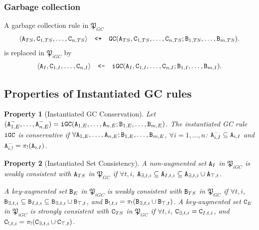 \documentclass{article}
\numberwithin{equation}{section}
\newtheorem{property}{Property}[section]
\renewcommand{\tt}[1]{\ifmmode\text{\texttt{#1}}\else\texttt{#1}\fi}
\begin{document}
\subsubsection{Garbage collection}
A garbage collection rule in $\mathfrak{P}_{GC}$
\begin{align*}
\langle \tt{A}_{TS}, \tt{C}_{1,TS}, \dots, \tt{C}_{n,TS} \rangle
\quad\tt{<+}\quad
\tt{GC}(\tt{A}_{TS}, \tt{C}_{1,TS}, \dots, \tt{C}_{n,TS}; \tt{B}_{1,TS}, \dots, \tt{B}_{m,TS}).
\end{align*}
is replaced in $\mathfrak{P}_{iGC}$ by
\begin{align*}
\langle \tt{A}_I, \tt{C}_{1,I}, \dots, \tt{C}_{n,I} \rangle
\quad\tt{<-}\quad
\tt{iGC}(\tt{A}_I, \tt{C}_{1,I}, \dots, \tt{C}_{n,I}; \tt{B}_{1,I}, \dots, \tt{B}_{m,I}).
\end{align*}



\subsection{Properties of Instantiated GC rules}
\begin{property}[Instantiated GC Conservation]\label{property:instantiated_gc_conservative}
Let $(\tt{A}_{1,E}^-, \dots, \tt{A}_{n,E}^-) = \tt{iGC}(\tt{A}_{1,E}, \dots, \tt{A}_{n,E}; \tt{B}_{1,E}, \dots, \tt{B}_{m,E})$.
The instantiated GC rule $\tt{iGC}$ is \emph{conservative} if $\forall \tt{A}_{1,E}, \dots, \tt{A}_{n,E}; \tt{B}_{1,E}, \dots, \tt{B}_{m,E}$, $\forall i=1,\dots,n$: $\tt{A}_{i,I}^- \subseteq \tt{A}_{i,I}$ and $\tt{A}_{i,!}^- = \pi_!(\tt{A}_{i,I})$.
\end{property}

\begin{property}[Instantiated Set Consistency]
A non-augmented set $\tt{A}_I$ in $\mathfrak{P}_{iGC}$ is \emph{weakly consistent} with $\tt{A}_{TS}$ in $\mathfrak{P}_{GC}$ if $\forall t, i$, $\tt{A}_{\exists,t,i} \subseteq \tt{A}_{I,t,i} \subseteq \tt{A}_{\exists,t,i} \cup \tt{A}_{\top,t}$.

A key-augmented set $\tt{B}_E$ in $\mathfrak{P}_{iGC}$ is \emph{weakly consistent} with $\tt{B}_{TS}$ in $\mathfrak{P}_{GC}$ if $\forall t, i$, $\tt{B}_{\exists,t,i} \subseteq \tt{B}_{I,t,i} \subseteq \tt{B}_{\exists,t,i} \cup \tt{B}_{\top,t}$, and $\tt{B}_{!,t,i} = \pi_!(\tt{B}_{\exists,t,i} \cup \tt{B}_{\top,t})$.
A key-augmented set $\tt{C}_E$ in $\mathfrak{P}_{iGC}$ is \emph{strongly consistent} with $\tt{C}_{TS}$ in $\mathfrak{P}_{GC}$ if $\forall t, i$, $\tt{C}_{\exists,t,i} = \tt{C}_{I,t,i}$, and $\tt{C}_{!,t,i} = \pi_!(\tt{C}_{\exists,t,i} \cup \tt{C}_{\top,t})$.
\end{property}
\end{document}
